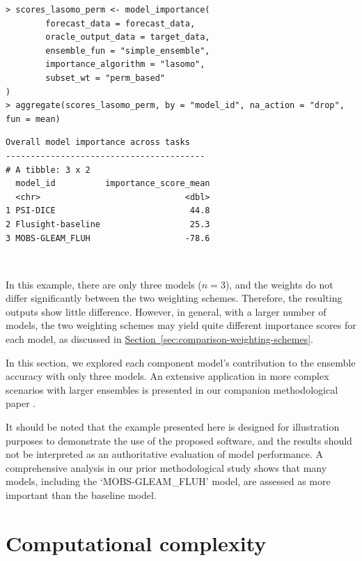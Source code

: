 \documentclass[
  article,
  shortnames,
  notitle]{jss}
\begin{document}
\vspace{0.35cm} 
\normalsize

\begin{verbatim}
> scores_lasomo_perm <- model_importance(
        forecast_data = forecast_data,
        oracle_output_data = target_data,
        ensemble_fun = "simple_ensemble",
        importance_algorithm = "lasomo",
        subset_wt = "perm_based"
)
> aggregate(scores_lasomo_perm, by = "model_id", na_action = "drop", fun = mean)
\end{verbatim}

\small

\begin{verbatim}
Overall model importance across tasks
---------------------------------------- 
# A tibble: 3 x 2
  model_id          importance_score_mean
  <chr>                             <dbl>
1 PSI-DICE                           44.8
2 Flusight-baseline                  25.3
3 MOBS-GLEAM_FLUH                   -78.6
\end{verbatim}

\normalsize

~~

In this example, there are only three models (\(n = 3\)), and the
weights do not differ significantly between the two weighting schemes.
Therefore, the resulting outputs show little difference. However, in
general, with a larger number of models, the two weighting schemes may
yield quite different importance scores for each model, as discussed in
\hyperref[sec:comparison-weighting-schemes]{Section~\ref{sec:comparison-weighting-schemes}}.

In this section, we explored each component model's contribution to the
ensemble accuracy with only three models. An extensive application in
more complex scenarios with larger ensembles is presented in our
companion methodological paper \citep{kim2026beyond}.

It should be noted that the example presented here is designed for
illustration purposes to demonstrate the use of the proposed software,
and the results should not be interpreted as an authoritative evaluation
of model performance. A comprehensive analysis in our prior
methodological study \citep{kim2026beyond} shows that many models,
including the `MOBS-GLEAM\_FLUH' model, are assessed as more important
than the baseline model.

\section{Computational complexity}\label{sec:computational-complexity}
\end{document}
